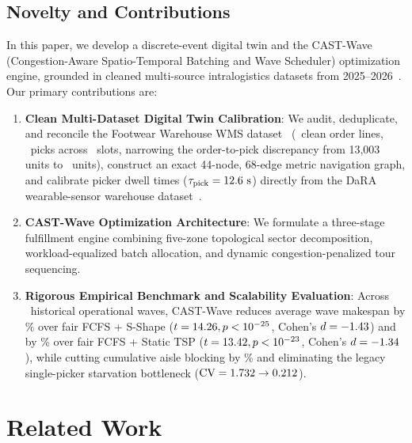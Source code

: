 \documentclass[conference]{IEEEtran}
\begin{document}
\subsection{Novelty and Contributions}
\label{sec:contributions}
In this paper, we develop a discrete-event digital twin and the CAST-Wave (Congestion-Aware Spatio-Temporal Batching and Wave Scheduler) optimization engine, grounded in cleaned multi-source intralogistics datasets from 2025--2026~\cite{assis2025order,niemann2026dara,barlang2026kit}. Our primary contributions are:
\begin{enumerate}
    \item \textbf{Clean Multi-Dataset Digital Twin Calibration}: We audit, deduplicate, and reconcile the Footwear Warehouse WMS dataset~\cite{assis2025order} (\TotalOrderLines~clean order lines, \TotalPicks~picks across \TotalLocations~slots, narrowing the order-to-pick discrepancy from 13,003 units to \UnitGapReconciled~units), construct an exact 44-node, 68-edge metric navigation graph, and calibrate picker dwell times ($\tau_{\text{pick}} = 12.6\text{ s}$) directly from the DaRA wearable-sensor warehouse dataset~\cite{niemann2026dara}.
    \item \textbf{CAST-Wave Optimization Architecture}: We formulate a three-stage fulfillment engine combining five-zone topological sector decomposition, workload-equalized batch allocation, and dynamic congestion-penalized tour sequencing.
    \item \textbf{Rigorous Empirical Benchmark and Scalability Evaluation}: Across \BenchmarkWaves~historical operational waves, CAST-Wave reduces average wave makespan by \MakespanRedSShapePct\% over fair FCFS + S-Shape ($t = 14.26, p < 10^{-25}$, Cohen's $d = -1.43$) and by \MakespanRedTSPPct\% over fair FCFS + Static TSP ($t = 13.42, p < 10^{-23}$, Cohen's $d = -1.34$), while cutting cumulative aisle blocking by \BlockedTimeReductionPct\% and eliminating the legacy single-picker starvation bottleneck ($\text{CV} = 1.732 \to 0.212$).
\end{enumerate}

\section{Related Work}
\label{sec:related_work}
\end{document}
